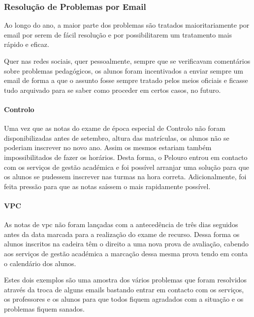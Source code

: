 
\subsubsection{Resolução de Problemas por Email}

Ao longo do ano, a maior parte dos problemas são tratados maioritariamente por email por serem de fácil resolução e por possibilitarem um tratamento mais rápido e eficaz.

Quer nas redes sociais, quer pessoalmente, sempre que se verificavam comentários sobre problemas pedagógicos, os alunos foram incentivados a enviar sempre um email de forma a que o assunto fosse sempre tratado pelos meios oficiais e ficasse tudo arquivado para se saber como proceder em certos casos, no futuro.

\paragraph{Controlo}

Uma vez que as notas do exame de época especial de Controlo não foram disponibilizadas antes de setembro, altura das matrículas, os alunos não se poderiam inscrever no novo ano. Assim os mesmos estariam também impossibilitados de fazer os horários. Desta forma, o Pelouro entrou em contacto com os serviços de gestão académica e foi possível arranjar uma solução para que os alunos se pudessem inscrever nas turmas na hora correta. Adicionalmente, foi feita pressão para que as notas saíssem o mais rapidamente possível.

\paragraph{VPC}

As notas de \acrfull{vpc} não foram lançadas com a antecedência de três dias seguidos antes da data marcada para a realização do exame de recurso. Dessa forma os alunos inscritos na cadeira têm o direito a uma nova prova de avaliação, cabendo aos serviços de gestão académica a marcação dessa mesma prova tendo em conta o calendário dos alunos. 

Estes dois exemplos são uma amostra dos vários problemas que foram resolvidos através da troca de alguns emails bastando entrar em contacto com os serviços, os professores e os alunos para que todos fiquem agradados com a situação e os problemas fiquem sanados.